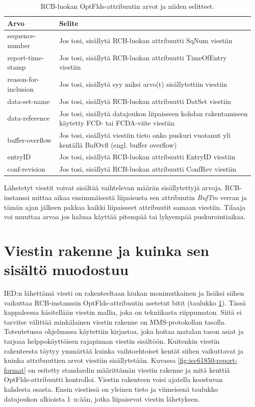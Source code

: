 \begin{table}[ht!]
	\caption{RCB-luokan OptFlds-attribuutin arvot ja niiden selitteet.}
	\label{tab:iec61850-optional-fields-definition}
	\begin{tabular}{l | l}
		\hline
		\textbf{Arvo} & \textbf{Selite} \\
		\hline \hline
		sequence-number & Jos tosi, sisällytä RCB-luokan attribuutti SqNum viestiin \\
		report-time-stamp & Jos tosi, sisällytä RCB-luokan attribuutti TimeOfEntry viestiin \\
		reason-for-inclusion & Jos tosi, sisällytä syy miksi arvo(t) sisällytettiin viestiin \\
		data-set-name & Jos tosi, sisällytä RCB-luokan attribuutti DatSet viestiin \\
		data-reference & \parbox[t]{10cm}{Jos tosi, sisällytä datajoukon liipaisseen kohdan rakentamiseen käytetty FCD- tai FCDA-viite viestiin} \\
		buffer-overflow & \parbox[t]{10cm}{Jos tosi, sisällytä viestiin tieto onko puskuri vuotanut yli kentällä BufOvfl (engl. buffer overflow)} \\
		entryID & Jos tosi, sisällytä RCB-luokan attribuutti EntryID viestiin \\
		conf-revision & Jos tosi, sisällytä RCB-luokan attribuutti ConfRev viestiin \\
		\hline
	\end{tabular}
\end{table}

Lähetetyt viestit voivat sisältää vaihtelevan määrän sisällytettyjä arvoja. RCB-instanssi mittaa aikaa ensimmäisestä liipaisusta sen attribuutin \emph{BufTm} verran ja tämän ajan jälkeen pakkaa kaikki liipaisseet attribuutit samaan viestiin. Tilaaja voi muuttaa arvoa jos haluaa käyttää pitempää tai lyhyempää puskurointiaikaa.


\section{Viestin rakenne ja kuinka sen sisältö muodostuu}
\label{ch:viestin-rakenne}
IED:n lähettämä viesti on rakenteeltaan hiukan monimutkainen ja lisäksi siihen vaikuttaa RCB-instanssin OptFlds-attribuutin asetetut bitit (taulukko \ref{tab:iec61850-optional-fields-definition}). Tässä kappaleessa käsitellään viestin mallia, joka on tekniikasta riippumaton. Siitä ei tarvitse välittää minkälainen viestin rakenne on MMS-protokollan tasolla. Toteutetussa ohjelmassa käytettiin kirjastoa, joka hoitaa matalan tason asiat ja tarjoaa helppokäyttöisen rajapinnan viestin sisältöön. Kuitenkin viestin rakenteesta täytyy ymmärtää kuinka vaihtoehtoiset kentät siihen vaikuttavat ja kuinka attribuuttien arvot viestiin sisällytetään. Kuvassa \ref{fig:iec61850-report-format} on esitetty standardin määrittämän viestin rakenne ja mitä kenttiä OptFlds-attribuutti kontrolloi. Viestin rakenteen voisi ajatella koostuvan kahdesta osasta. Ensin viestissä on yleinen tieto ja viimeisenä taulukko datajoukon alkioista 1--n:ään, jotka liipaisevat viestin lähetyksen.

